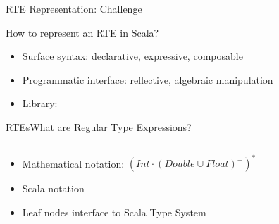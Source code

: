 


{  
\begin{frame}{RTE Representation: Challenge }

  How to represent an RTE in Scala?


  \medskip
  
  \begin{itemize}
  \item Surface syntax: declarative, expressive, composable
  \item Programmatic interface: reflective, algebraic manipulation
  \item Library: 
  \end{itemize}
\end{frame}
}

\newsavebox\exnotebox
\begin{lrbox}{\exnotebox}
  \begin{minipage}{6.5cm}
    
  \end{minipage}
\end{lrbox}


\begin{frame}{RTEs}{What are Regular Type Expressions?}
  \begin{columns}
    \begin{column}{0.55\textwidth}
  \begin{itemize}
  \item Mathematical notation: $(Int \cdot (Double \cup Float)^+)^*$
  \item Scala notation\\
    \usebox\exnotebox
  \item Leaf nodes interface to Scala Type System
  \end{itemize}
    \end{column}%
    \begin{column}{0.45\textwidth}
      \scalebox{0.7}{}
    \end{column}%
  \end{columns}%
\end{frame}


\newsavebox\exampleAbox
\begin{lrbox}{\exampleAbox}
  \begin{minipage}{12cm}
    
  \end{minipage}
\end{lrbox}



